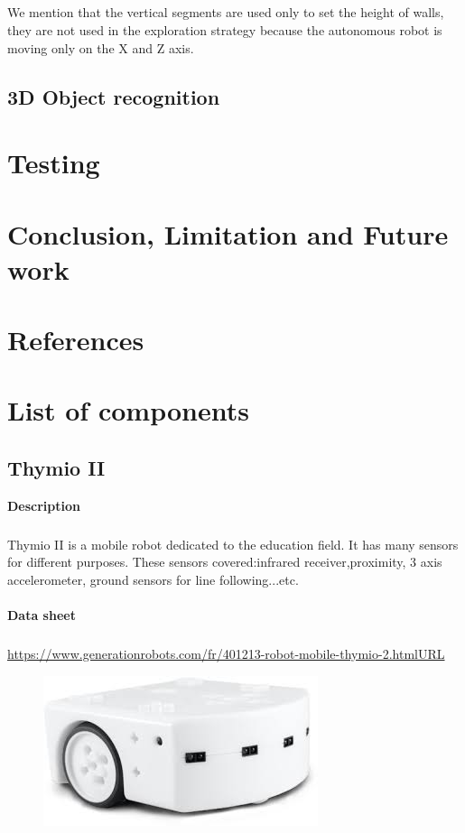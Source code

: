 \documentclass[12pt]{report}
\begin{document}
 \paragraph{}
 We mention that the vertical segments are used only to set the height of walls, they are not used in the exploration strategy because the autonomous robot is moving only on the X and Z axis.
	\section{3D Object recognition}

	\chapter{Testing}
	\chapter{Conclusion, Limitation and Future work}
	\chapter{References}


	\appendix
	\chapter{List of components}
	\section{Thymio II}
	\textbf{Description} 
	\paragraph{}
	Thymio II is a mobile robot dedicated to the education field. It has many sensors for different purposes. These sensors covered:infrared receiver,proximity, 3 axis accelerometer, ground sensors for line following...etc.
	\\ \\
	\textbf{Data sheet} 
	\paragraph{}
	\url{https://www.generationrobots.com/fr/401213-robot-mobile-thymio-2.htmlURL}
	\begin{figure}[H]
		\begin{center}
			\includegraphics[scale=0.6]{res/thymio.jpg}
		\end{center}
	\end{figure}
\end{document}
